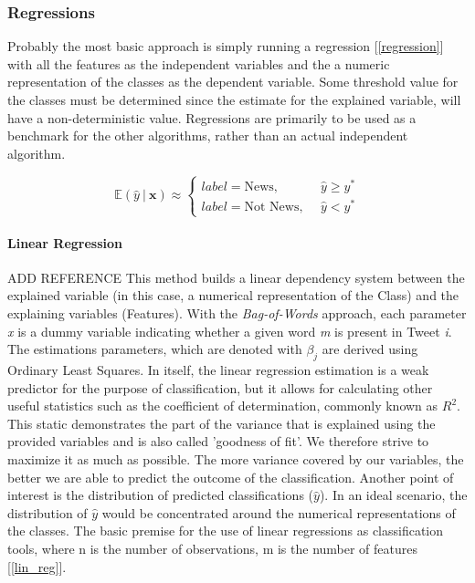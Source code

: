 	\subsubsection{Regressions}
	Probably the most basic approach is simply running a regression [\ref{regression}] with all the features as the independent variables and the a numeric representation of the classes as the dependent variable. Some threshold value for the classes must be determined since the estimate for the explained variable, will have a non-deterministic value. Regressions are primarily to be used as a benchmark for the other algorithms, rather than an actual independent algorithm.
	
	\begin{equation}
		\mathbb{E}(\hat{y} \ \vert \ \textbf{x}) \approx 
		\begin{cases}
			label = \text{News}, &\hat{y} \geq y^* \\
			label = \text{Not News},\ \ &\hat{y} < y^*
		\end{cases}
		\label{regression}
	\end{equation}
	
	\par
	\paragraph{Linear Regression}
		{\color{red} ADD REFERENCE}
		This method builds a linear dependency system between the explained variable (in this case, a numerical representation of the Class) and the explaining variables (Features). With the \textit{Bag-of-Words} approach, each parameter \textit{x} is a dummy variable indicating whether a given word \textit{m} is present in Tweet \textit{i}. The estimations parameters, which are denoted with $\beta_j$ are derived using Ordinary Least Squares. In itself, the linear regression estimation is a weak predictor for the purpose of classification, but it allows for calculating other useful statistics such as the coefficient of determination, commonly known as $R^2$. This static demonstrates the part of the variance that is explained using the provided variables and is also called 'goodness of fit'. We therefore strive to maximize it as much as possible. The more variance covered by our variables, the better we are able to predict the outcome of the classification. Another point of interest is the distribution of predicted classifications ($\hat{y}$). In an ideal scenario, the distribution of $\hat{y}$ would be concentrated around the numerical representations of the classes.	The basic premise for the use of linear regressions as classification tools, where n is the number of observations, m is the number of features [\ref{lin_reg}].
	
